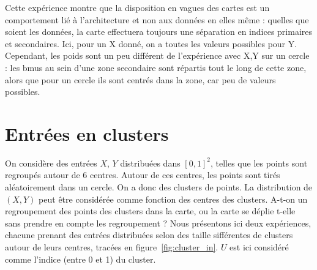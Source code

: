 Cette expérience montre que la disposition en vagues des cartes est un comportement lié à l'architecture et non aux données en elles même : quelles que soient les données, la carte effectuera toujours une séparation en indices primaires et secondaires. Ici, pour un X donné, on a toutes les valeurs possibles pour Y.
Cependant, les poids sont un peu différent de l'expérience avec X,Y sur un cercle : les bmus au sein d'une zone secondaire sont répartis tout le long de cette zone, alors que pour un cercle ils sont centrés dans la zone, car peu de valeurs possibles.


\section{Entrées en clusters}

On considère des entrées $X$, $Y$ distribuées dans $[0,1]^2$, telles que les points sont regroupés autour de 6 centres. Autour de ces centres, les points sont tirés aléatoirement dans un cercle. On a donc des clusters de points. La distribution de $(X,Y)$ peut être considérée comme fonction des centres des clusters.  A-t-on un regroupement des points des clusters dans la carte, ou la carte se déplie t-elle sans prendre en compte les regroupement ? Nous présentons ici deux expériences, chacune prenant des entrées distribuées selon des taille  sifférentes de clusters autour de leurs centres, tracées en figure~\ref{fig:cluster_in}.  $U$ est ici considéré comme l'indice (entre 0 et 1) du cluster.

